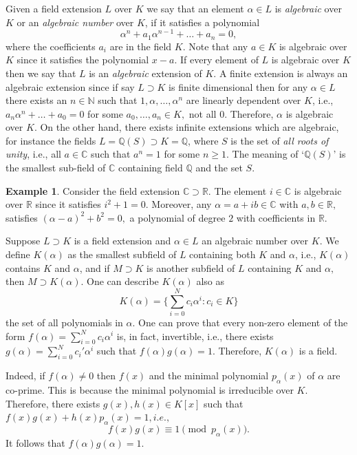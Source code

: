 \documentclass[a4paper,onecolumn,accepted=2026-04-08,10pt]{quantumarticle}
\theoremstyle{definition}
\newtheorem{example}[theorem]{Example}
\begin{document}
Given a field extension $L$ over $K$ we say that an element $\alpha \in L$ is \textit{algebraic} over $K$ or an \textit{algebraic number} over $K$, if it satisfies a polynomial $$\alpha^n + a_1{\alpha}^{n-1} + \ldots + a_n = 0,$$
where the coefficients $a_i$ are in the field $K$. Note that any $a \in K$ is algebraic over $K$ since it satisfies the polynomial $x - a$.   If every element of $L$ is algebraic over $K$ then we say that $L$ is an \textit{algebraic} extension of $K$. A finite extension is always an algebraic extension since if say $L\supset K$ is finite dimensional then for any $\alpha \in L$ there exists an $n \in \mathbb{{N}}$ such that $1, \alpha, \ldots, \alpha^n$ are linearly dependent over $K$, i.e., $a_n \alpha^n + \ldots + a_0 = 0$ for some $a_0, \ldots, a_n \in K,$ not all $0$. Therefore, $\alpha$ is algebraic over $K$.  On the other hand, there exists infinite extensions which are algebraic, for instance the fields $L = \mathbb{Q}(S) \supset K = \mathbb{Q}$, where $S$ is the set of \textit{all roots of unity}, i.e., all $a \in \mathbb{C}$ such that $a^n = 1$ for some $n\geq 1.$ The meaning of `$\mathbb{Q}(S)$' is the smallest sub-field of $\mathbb{C}$ containing field $\mathbb{Q}$ and the set $S.$


\begin{example}
    Consider the field extension $\mathbb{C} \supset \mathbb{R}$. The element $i \in \mathbb{C}$ is algebraic over $\mathbb{R}$ since it satisfies $i^2 + 1 = 0.$ Moreover, any $\alpha = a + i b \in \mathbb{C}$ with $a,b \in \mathbb{R},$ satisfies $(\alpha - a)^2 + b^2 = 0,$ a polynomial of degree $2$ with coefficients in $\mathbb{R}.$
\end{example}


Suppose $L \supset K$ is a field extension and $\alpha \in L$ an algebraic number over $K$. We define $K(\alpha)$ as the smallest subfield of $L$ containing both $K$ and $\alpha$, i.e., $K(\alpha)$ contains $K$ and $\alpha$, and if $M \supset K$ is another subfield of $L$ containing $K$ and $\alpha,$ then $M \supset K(\alpha).$ One can describe $K(\alpha)$ also as $$K(\alpha) = \{ \sum_{i=0}^{N} c_{i} \alpha^{i} : c_{i} \in K\}$$
the set of all polynomials in $\alpha.$ One can prove that every non-zero element of the form $f(\alpha) = \sum_{i=0}^{N} c_{i} \alpha^{i} $ is, in fact, invertible, i.e., there exists $g(\alpha) = \sum_{i=0}^{N} c_{i}' \alpha^{i}$ such that $f(\alpha)g(\alpha) = 1.$ Therefore, $K(\alpha)$ is a field. 


Indeed, if $f(\alpha) \neq 0$ then $f(x)$ and the minimal polynomial $p_{\alpha}(x)$ of $\alpha$ are co-prime. This is because the minimal polynomial is irreducible over $K.$ Therefore, there exists $g(x), h(x) \in K[x]$ such that $f(x)g(x) + h(x)p_{\alpha}(x) = 1, i.e.,$ $$f(x)g(x) \equiv 1 \pmod{p_{\alpha}(x)}.$$
It follows that $f(\alpha)g(\alpha) = 1.$
\end{document}
